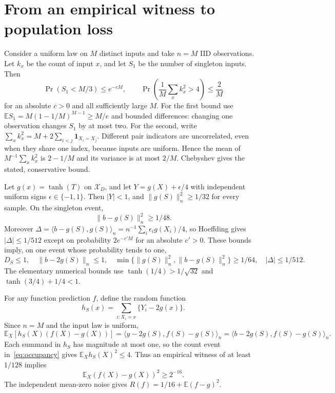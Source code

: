 \section{From an empirical witness to population loss}
\label{sec:population}
Consider a uniform law on $M$ distinct inputs and take $n=M$ IID observations. Let $k_x$ be the count of input $x$, and let $S_1$ be the number of singleton inputs. Then
\begin{equation}
 \Pr(S_1<M/3)\le e^{-cM},\qquad
 \Pr\left(\frac1M\sum_x k_x^2>4\right)\le\frac2M
 \label{eq:occupancy}
\end{equation}
for an absolute $c>0$ and all sufficiently large $M$.
For the first bound use $\mathbb E S_1=M(1-1/M)^{M-1}\ge M/e$ and bounded differences: changing one observation changes $S_1$ by at most two.
For the second, write $\sum_x k_x^2=M+2\sum_{i<j}\mathbf1_{X_i=X_j}$.
Different pair indicators are uncorrelated, even when they share one index, because inputs are uniform. Hence the mean of $M^{-1}\sum_xk_x^2$ is $2-1/M$ and its variance is at most $2/M$. Chebyshev gives the stated, conservative bound.

Let $g(x)=\tanh(T)$ on $\mathcal X_D$, and let $Y=g(X)+\epsilon/4$ with independent uniform signs $\epsilon\in\{-1,1\}$. Then $|Y|<1$, and $\|g(S)\|_n^2\ge1/32$ for every sample. On the singleton event,
\[
 \|b-g(S)\|_n^2\ge1/48.
\]
Moreover $\Delta=\langle b-g(S),g(S)\rangle_n=n^{-1}\sum_i\epsilon_i g(X_i)/4$, so Hoeffding gives $|\Delta|\le1/512$ except on probability $2e^{-c'M}$ for an absolute $c'>0$.
These bounds imply, on one event whose probability tends to one,
\begin{equation}
 D_S\le1,\quad \|b-2g(S)\|_n\le1,\quad
 \min\{\|g(S)\|_n^2,\|b-g(S)\|_n^2\}\ge1/64,
 \quad |\Delta|\le1/512.
 \label{eq:sample-event}
\end{equation}
The elementary numerical bounds use $\tanh(1/4)>1/\sqrt{32}$ and $\tanh(3/4)+1/4<1$.

For any function prediction $f$, define the random function
\[
 h_S(x)=\sum_{i:X_i=x}\{Y_i-2g(x)\}.
\]
Since $n=M$ and the input law is uniform,
\begin{equation}
 \mathbb E_X[h_S(X)(f(X)-g(X))]
 =\langle y-2g(S),f(S)-g(S)\rangle_n
 =\langle b-2g(S),f(S)-g(S)\rangle_n.
 \label{eq:population-witness}
\end{equation}
Each summand in $h_S$ has magnitude at most one, so the count event in~\eqref{eq:occupancy} gives $\mathbb E_Xh_S(X)^2\le4$.
Thus an empirical witness of at least $1/128$ implies
\begin{equation}
 \mathbb E_X(f(X)-g(X))^2\ge 2^{-16}.
 \label{eq:excess-constant}
\end{equation}
The independent mean-zero noise gives $R(f)=1/16+\mathbb E(f-g)^2$.
